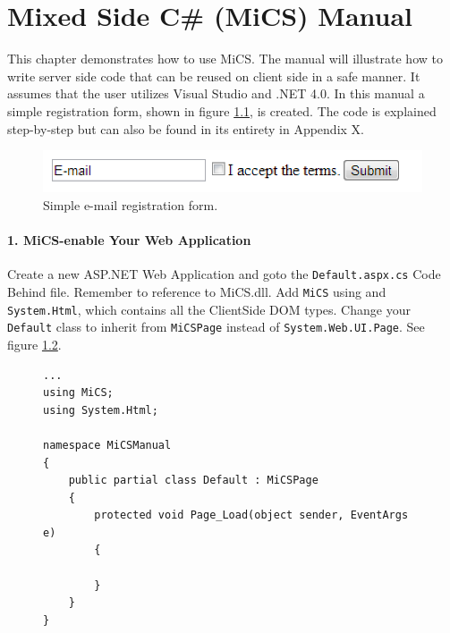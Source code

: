 \chapter{Mixed Side C\# (MiCS) Manual}

This chapter demonstrates how to use MiCS. The manual will illustrate how to write server side code that can be reused on client side in a safe manner. It assumes that the user utilizes Visual Studio and .NET 4.0. In this manual a simple registration form, shown in figure \ref{fig:manual_registrationform}, is created. The code is explained step-by-step but can also be found in its entirety in Appendix X.


\begin{figure}[H]
	\begin{center}
		\centerline{\includegraphics[width=12cm]{resources/images/manual_registrationform.png}}
	\end{center}
	\caption{Simple e-mail registration form.}
	\label{fig:manual_registrationform}
\end{figure}


\subsubsection{1. MiCS-enable Your Web Application} %
\label{ssub:mics_enable_your_web_application}
Create a new ASP.NET Web Application and goto the \texttt{Default.aspx.cs} Code Behind file. Remember to reference to MiCS.dll. Add \texttt{MiCS} using and \texttt{System.Html}, which contains all the ClientSide DOM types. Change your \texttt{Default} class to inherit from \texttt{MiCSPage} instead of \texttt{System.Web.UI.Page}. See figure \ref{fig:mics_enable_web_application}.
\begin{figure}[H]
\begin{lstlisting}[language=CSharp,classoffset=1,morekeywords={Default,MiCSPage,Button,CheckBox,TextBox,EventArgs,ClientSide,InputElement,Document,CheckBoxElement,Window,MixedSide,Regex}]
...
using MiCS;
using System.Html;

namespace MiCSManual
{
    public partial class Default : MiCSPage
    {
        protected void Page_Load(object sender, EventArgs e)
        {
   
        }
    }
}
\end{lstlisting}
\caption{}
\label{fig:mics_enable_web_application}
\end{figure}

